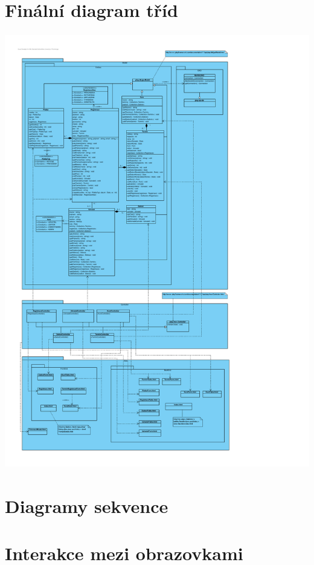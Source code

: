 \documentclass[12pt,a4paper,titlepage,final]{report}
\begin{document}
\section{Finální diagram tříd}
		
		\begin{center}
			\captionsetup{type=figure}
			\includegraphics[height=19cm]{img/architektura-detail.pdf}
		\end{center}

		
\section{Diagramy sekvence}

		
\section{Interakce mezi obrazovkami}
\end{document}
